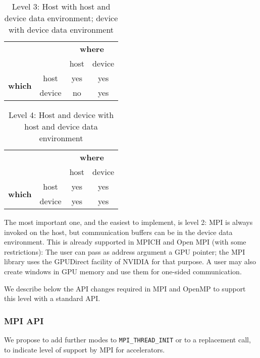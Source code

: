 \begin{table}[H]
\begin{tabular}{|c|c|c|c|}
	\cline{3-4}
	\multicolumn{2}{c|}{} & \multicolumn{2}{c|}{\textbf{where}} \\
	\cline{3-4}
	\multicolumn{2}{c|}{} & host & device \\
	\hline
	\multirow{2}{30 pt}{\textbf{which}} & host & yes & yes \\
	\cline{2-4}
	& device & no & yes \\
	\hline
	\end{tabular}
	\caption*{Level 3: Host with host and device data environment; device with 
	device 
	data environment}
\end{table}

\begin{table}[H]
\begin{tabular}{|c|c|c|c|}
	\cline{3-4}
	\multicolumn{2}{c|}{} & \multicolumn{2}{c|}{\textbf{where}} \\
	\cline{3-4}
	\multicolumn{2}{c|}{} & host & device \\
	\hline
	\multirow{2}{30 pt}{\textbf{which}} & host & yes & yes \\
	\cline{2-4}
	& device & yes & yes \\
	\hline
	\end{tabular}
	\caption*{Level 4: Host and device with host and device data environment}
\end{table}

The most important one, and the easiest to implement, is level 2: MPI is always 
invoked on the host, but communication buffers can be in the device data 
environment. This is already supported in MPICH and Open MPI (with some 
restrictions): The user can pass as address argument a GPU pointer; the MPI 
library uses the GPUDirect facility of NVIDIA \cite{gpudirect,Shainer2011} for 
that purpose. A 
user may also create windows in GPU memory and use them for one-sided 
communication.
 
We describe below the API changes required in MPI and OpenMP to support this 
level with a standard API.

\subsubsection{MPI API}

We propose to add further modes to \texttt{MPI\_THREAD\_INIT} or to a 
replacement 
call, to indicate level of support by MPI for accelerators. 

